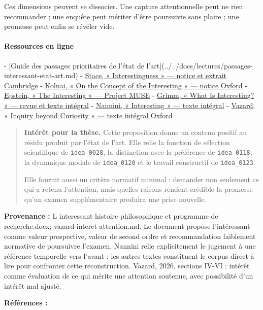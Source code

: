 \documentclass[10pt,a4paper]{article}
\begin{document}
Ces dimensions peuvent se dissocier. Une capture attentionnelle peut ne rien recommander ; une enquête peut mériter d'être poursuivie sans plaire ; une promesse peut enfin se révéler vide.

\paragraph{Ressources en ligne}
- [Guide des passages prioritaires de l'état de l'art](../../docs/lectures/passages-interessant-etat-art.md) - \href{\detokenize{https://www.cambridge.org/core/journals/philosophy/article/abs/interestingness/EEF830F5A3202674EB10D1B6452386E5}}{Stace, « Interestingness » — notice et extrait Cambridge} - \href{\detokenize{https://academic.oup.com/bjaesthetics/article/4/1/22/16793}}{Kolnai, « On the Concept of the Interesting » — notice Oxford} - \href{\detokenize{https://muse.jhu.edu/article/364012}}{Epstein, « The Interesting » — Project MUSE} - \href{\detokenize{https://logos-and-episteme.acadiasi.ro/volume-ii-issue-4-december-2011/}}{Grimm, « What Is Interesting? » — revue et texte intégral} - \href{\detokenize{https://lexicon.mimesisjournals.com/archive/2018/autumn/Interesting.pdf}}{Nannini, « Interesting » — texte intégral} - \href{\detokenize{https://academic.oup.com/pq/advance-article/doi/10.1093/pq/pqag014/8571347}}{Vazard, « Inquiry beyond Curiosity » — texte intégral Oxford}

\begin{quote}
\textbf{Intérêt pour la thèse.} Cette proposition donne un contenu positif au résidu produit par l'état de l'art. Elle relie la fonction de sélection scientifique de \texttt{idea\_0028}, la distinction avec la préférence de \texttt{idea\_0118}, la dynamique modale de \texttt{idea\_0120} et le travail constructif de \texttt{idea\_0123}.

Elle fournit aussi un critère normatif minimal : demander non seulement ce qui a retenu l'attention, mais quelles raisons rendent crédible la promesse qu'un examen supplémentaire produira une prise nouvelle.
\end{quote}
{\footnotesize\color{metadata}\textbf{Provenance :} L interessant histoire philosophique et programme de recherche.docx; vazard-interet-attention.md. Le document propose l'intéressant comme valeur prospective, valeur de second ordre et recommandation faiblement normative de poursuivre l'examen. Nannini relie explicitement le jugement à une référence temporelle vers l'avant ; les autres textes constituent le corpus direct à lire pour confronter cette reconstruction. Vazard, 2026, sections IV-VI : intérêt comme évaluation de ce qui mérite une attention soutenue, avec possibilité d'un intérêt mal ajusté.\par}
{\footnotesize\color{metadata}\textbf{Références :} \parencite{stace1944interestingness,kolnai1964concept,ngai2008merely,epstein2009interesting,grimm2011interesting,nannini2018interesting,vazard2026inquiry}\par}
\end{document}
